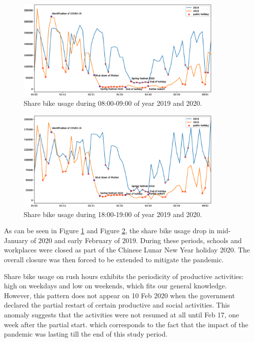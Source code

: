 \documentclass[preprints,ijgi,submit,moreauthors]{Definitions/mdpi}
\begin{document}
\begin{figure}[H]
    \centering
    \includegraphics[width=0.9\textwidth]{Figures/hour_8.eps}
    \caption{Share bike usage during 08:00-09:00 of year 2019 and 2020.}
    \label{fig:hour_comparison_8}
\end{figure}
\begin{figure}[H]
    \centering
    \includegraphics[width=0.9\textwidth]{Figures/hour_18.eps}
    \caption{Share bike usage during 18:00-19:00 of year 2019 and 2020.}
    \label{fig:hour_comparison_18}
\end{figure}

As can be seen in Figure \ref{fig:hour_comparison_8} and Figure \ref{fig:hour_comparison_18}, the share bike usage drop in mid-January of 2020 and early February of 2019.
During these periods, schools and workplaces were closed as part of the Chinese Lunar New Year holiday 2020.
The overall closure was then forced to be extended to mitigate the pandemic.

Share bike usage on rush hours exhibits the periodicity of productive activities: high on weekdays and low on weekends, which fits our general knowledge.
However, this pattern does not appear on 10 Feb 2020 when the government declared the partial restart of certain productive and social activities.
This anomaly suggests that the activities were not resumed at all until Feb 17, one week after the partial start.
which corresponds to the fact that the impact of the pandemic was lasting till the end of this study period.
\end{document}
